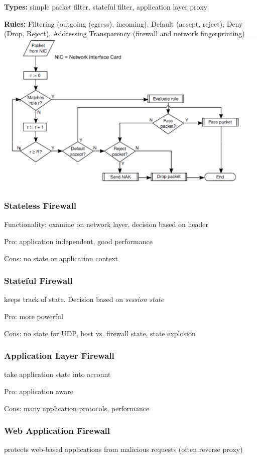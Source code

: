 \documentclass[fs, footer]{latex4ei}
\begin{document}
\begin{multicols*}{4}
{\textbf{Types:} simple packet filter, stateful filter, application layer proxy

\textbf{Rules:} Filtering (outgoing (egress), incoming), Default (accept, reject), Deny (Drop, Reject), Addressing Transparency (firewall and network fingerprinting)
\includegraphics[width=\columnwidth]{img/firewallrule.png}

\subsubsection{Stateless Firewall}
Functionality: examine on network layer, decision based on header

Pro: application independent, good performance

Cons: no state or application context

\subsubsection{Stateful Firewall}
keeps track of state. Decision based on \emph{session state}

Pro: more powerful

Cons: no state for UDP, host vs. firewall state, state explosion

 \subsubsection{Application Layer Firewall}
 take application state into account

 Pro: application aware

 Cons: many application protocols, performance

 \subsubsection{Web Application Firewall}
protects web-based applications from malicious requests (often reverse proxy)

}
\end{multicols*}
\end{document}
